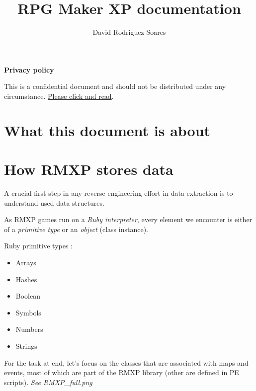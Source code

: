 \documentclass[11pt]{article}
\title{RPG Maker XP documentation}
\author{David Rodriguez Soares}
\begin{document}
\maketitle

\vspace*{\fill}

\textbf{Privacy policy}

This is a confidential document and should not be distributed under any circumstance. \hyperref[sec:privacypolice]{Please click and read}.

\vspace{20mm}

\newpage

\begingroup
\hypersetup{linkcolor=black}
\tableofcontents
\endgroup

\newpage
\section{What this document is about}






\newpage
\section{How RMXP stores data}

A crucial first step in any reverse-engineering effort in data extraction is to understand used data structures.

As RMXP games run on a \textit{Ruby interpreter}, every element we encounter is either of a \textit{primitive type} or an \textit{object} (class instance).

Ruby primitive types :
\begin{itemize}
	\item Arrays
	\item Hashes
	\item Boolean
	\item Symbols
	\item Numbers
	\item Strings
	
\end{itemize}

\vspace{2mm}
For the task at end, let's focus on the classes that are associated with maps and events, most of which are part of the RMXP library (other are defined in PE scripts). \textit{See RMXP\_full.png}
\end{document}
